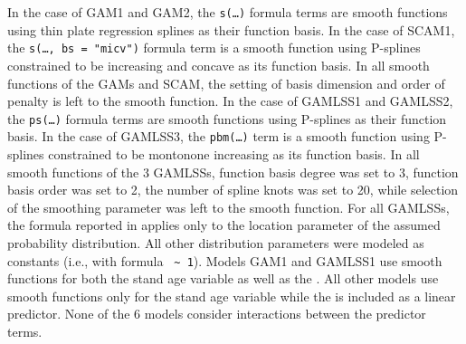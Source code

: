 In the case of GAM1 and GAM2, the \texttt{s(\textnormal{\ldots})} formula terms are smooth functions using thin plate regression splines as their function basis.  In the case of SCAM1, the \texttt{s(\textnormal{\ldots{}}, bs = "micv")} formula term is a smooth function using P-splines constrained to be increasing and concave as its function basis.  In all smooth functions of the GAMs and SCAM, the setting of basis dimension and order of penalty is left to the smooth function.  In the case of GAMLSS1 and GAMLSS2, the \texttt{ps(\textnormal{\ldots})} formula terms are smooth functions using P-splines as their function basis.  In the case of GAMLSS3, the \texttt{pbm(\textnormal{\ldots{}})} term is a smooth function using P-splines constrained to be montonone increasing as its function basis.  In all smooth functions of the 3 GAMLSSs, function basis degree was set to 3, function basis order was set to 2, the number of spline knots was set to 20, while selection of the smoothing parameter was left to the smooth function. For all GAMLSSs, the formula reported in  applies only to the location parameter of the assumed probability distribution. All other distribution parameters were modeled as constants (i.e., with formula \mbox{\texttt{\BasalAreaR{} \textasciitilde{} 1}}).  Models GAM1 and GAMLSS1 use smooth functions for both the stand age variable as well as the \ProductivityIndexVariableText{}.  All other models use smooth functions only for the stand age variable while the \ProductivityIndexVariableText{} is included as a linear predictor.  None of the 6 models consider interactions between the predictor terms.

